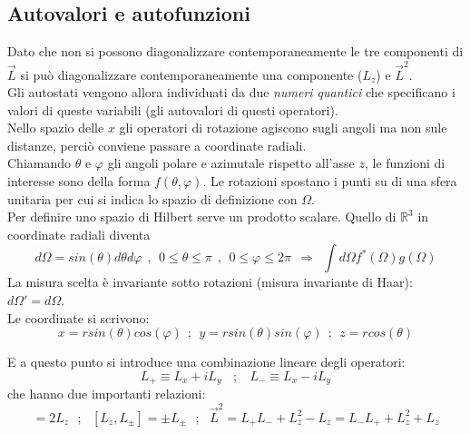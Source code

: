 \documentclass[twoside]{article}
\begin{document}
\subsection{Autovalori e autofunzioni}
Dato che non si possono diagonalizzare contemporaneamente le tre componenti di $\Vec{L}$ si può diagonalizzare contemporaneamente una componente ($L_z$) e $\Vec{L}^2$.
\\
Gli autostati vengono allora individuati da due \textit{numeri quantici} che specificano i valori di queste variabili (gli autovalori di questi operatori).
\\
Nello spazio delle $x$ gli operatori di rotazione agiscono sugli angoli ma non sule distanze, perciò conviene passare a coordinate radiali.
\\
Chiamando $\theta$ e $\varphi$ gli angoli polare e azimutale rispetto all'asse $z$, le funzioni di interesse sono della forma $f(\theta, \varphi)$.
Le rotazioni spostano i punti su di una sfera unitaria per cui si indica lo spazio di definizione con $\Omega$.
\\
Per definire uno spazio di Hilbert serve un prodotto scalare. Quello di $\mathds{R}^3$ in coordinate radiali diventa
\begin{equation}
    d\Omega=sin(\theta)d\theta d\varphi \ \ , \ \ 0\leq \theta \leq \pi \ \ , \ \ 0\leq \varphi \leq 2\pi \ \ \Rightarrow \ \ \int d\Omega f^*(\Omega)g(\Omega)
\end{equation}
La misura scelta è invariante sotto rotazioni (misura invariante di Haar): $d\Omega'=d\Omega$.
\\
Le coordinate si scrivono:
\begin{equation}
    x=rsin(\theta)cos(\varphi) \ \ ; \ \ y=rsin(\theta)sin(\varphi) \ \ ; \ \ z=rcos(\theta)
\end{equation}

E a questo punto si introduce una combinazione lineare degli operatori:
\begin{equation}
    L_+ \equiv L_x+iL_y \ \ \ \ ; \ \ \ \ L_-\equiv L_x-iL_y
\end{equation}
che hanno due importanti relazioni:
\begin{equation}
    [L_+,L_-]=2L_z \ \ \ ; \ \ \ [L_z,L_{\pm}]=\pm L_{\pm} \ \ \ ; \ \ \ \Vec{L}^2=L_+ L_- + L_z ^2 -L_z=L_-L_++L_z^2+L_z
\end{equation}
\end{document}
